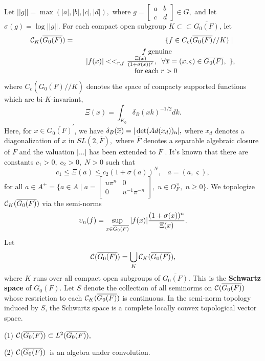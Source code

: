 Let $||g||=\max (|a|,|b|,|c|,|d|),$ where $g=\left[ 
\begin{array}{cc}
a & b \\ 
c & d
\end{array}
\right] \in G,$ and let $\sigma (g)=\log ||g||.$ For each compact open
subgroup $K\subset \subset \overline{G_0(F)}$, let 
\begin{eqnarray*}
{\cal C}_K(\overline{G_0(F)}) &=&\{f\in C_c(\overline{G_0(F)}//K)\;|\; \\
&&\ 
\begin{array}{c}
\;f\;{\rm genuine} \\ 
|f(x)|<<_{r,f}\frac{\Xi (x)}{(1+\sigma (x))^r},\;\;\forall \overline{x}%
=(x,\varsigma )\in \overline{G_0(F)}, \\ 
{\rm for\;each}\;r>0
\end{array}
\},
\end{eqnarray*}
where $C_c(\overline{G_0(F)}//K)$ denotes the space of compacty supported
functions which are bi-$K$-invariant, 
\[
\Xi (x)=\int_{K_0}\delta _B(xk)^{-1/2}dk. 
\]
Here, for $x\in \overline{G_0(F)}^{\prime }$, we have $\delta _B(\overline{x}%
)=|\det (Ad(x_d))_{{\frak n}}|,$ where $x_d$ denotes a diagonalization of $x$
in $SL(2,\overline{F}),$ where $\overline{F}$ denotes a separable algebraic
closure of $F$ and the valuation $|...|$ has been extended to $\overline{F}$%
. It's known that there are constants $c_1>0,\;c_2>0,\;N>0$ such that 
\[
c_1\leq \Xi (\overline{a})\leq c_2(1+\sigma (a))^N,\;\;\;\overline{a}%
=(a,\varsigma ), 
\]
for all $a\in A^{+}=\{a\in A\;|\;a=\left[ 
\begin{array}{cc}
u\pi ^n & 0 \\ 
0 & u^{-1}\pi ^{-n}
\end{array}
\right] ,\;u\in O_F^{\times },\;n\geq 0\}.$ We topologize ${\cal C}_K(%
\overline{G_0(F)})$ via the semi-norms 
\[
\upsilon _n(f)=\sup_{x\in \overline{G_0(F)}}|f(x)|\frac{(1+\sigma (x))^n}{%
\Xi (x)}. 
\]
Let 
\[
{\cal C}(\overline{G_0(F)})=\bigcup_K{\cal C}_K(\overline{G_0(F)}), 
\]
where $K$ runs over all compact open subgroups of $\overline{G_0(F)}$. This
is the {\bf Schwartz space} of $\overline{G_0(F)}$. Let $S$ denote the
collection of all seminorms on ${\cal C}(\overline{G_0(F)})$ whose
restriction to each ${\cal C}_K(\overline{G_0(F)})$ is continuous. In the
semi-norm topology induced by $S$, the Schwartz space is a complete locally
convex topological vector space.

\begin{lemma}
(1) ${\cal C}(\overline{G_0(F)})\subset L^2(\overline{G_0(F)}),$

(2) ${\cal C}(\overline{G_0(F)})$\ is an algebra under convolution.
\end{lemma}

